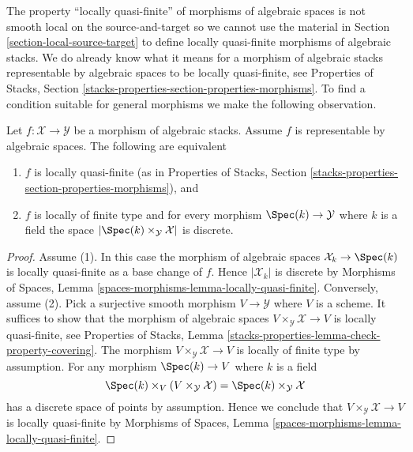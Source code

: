\noindent
The property ``locally quasi-finite'' of morphisms of algebraic spaces
is not smooth local on the source-and-target so we cannot use the material in
Section \ref{section-local-source-target}
to define locally quasi-finite morphisms of algebraic stacks.
We do already know what it means for a morphism of algebraic stacks
representable by algebraic spaces to be locally quasi-finite, see
Properties of Stacks, Section
\ref{stacks-properties-section-properties-morphisms}.
To find a condition suitable for general morphisms we make the following
observation.

\begin{lemma}
\label{lemma-representable-by-spaces-quasi-finite}
Let $f : \mathcal{X} \to \mathcal{Y}$ be a morphism of algebraic stacks.
Assume $f$ is representable by algebraic spaces.
The following are equivalent
\begin{enumerate}
\item $f$ is locally quasi-finite (as in Properties of Stacks,
Section \ref{stacks-properties-section-properties-morphisms}), and
\item $f$ is locally of finite type and for every morphism
$\Spec(k) \to \mathcal{Y}$ where $k$ is a field the
space $|\Spec(k) \times_\mathcal{Y} \mathcal{X}|$ is discrete.
\end{enumerate}
\end{lemma}

\begin{proof}
Assume (1). In this case the morphism of algebraic spaces
$\mathcal{X}_k \to \Spec(k)$ is locally quasi-finite as a base change
of $f$. Hence $|\mathcal{X}_k|$ is discrete by
Morphisms of Spaces, Lemma \ref{spaces-morphisms-lemma-locally-quasi-finite}.
Conversely, assume (2). Pick a surjective smooth morphism
$V \to \mathcal{Y}$ where $V$ is a scheme. It suffices to show that the
morphism of algebraic spaces $V \times_\mathcal{Y} \mathcal{X} \to V$
is locally quasi-finite, see
Properties of Stacks, Lemma
\ref{stacks-properties-lemma-check-property-covering}.
The morphism $V \times_\mathcal{Y} \mathcal{X} \to V$ is locally of finite
type by assumption. For any morphism $\Spec(k) \to V$ where $k$ is a
field
$$
\Spec(k) \times_V (V \times_\mathcal{Y} \mathcal{X}) =
\Spec(k) \times_\mathcal{Y} \mathcal{X}
$$
has a discrete space of points by assumption. Hence we conclude that
$V \times_\mathcal{Y} \mathcal{X} \to V$ is locally quasi-finite by
Morphisms of Spaces, Lemma \ref{spaces-morphisms-lemma-locally-quasi-finite}.
\end{proof}

